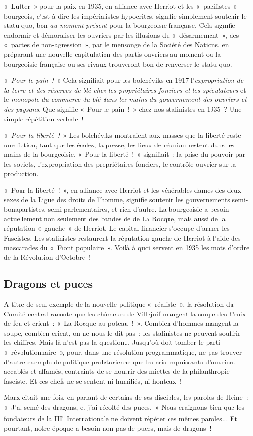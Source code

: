 \documentclass[french,twoside]{book} %
\begin{document}
« Lutter » pour la paix en 1935, en alliance avec Herriot et les « pacifistes » bourgeois, c’est-à-dire les impérialistes hypocrites, signifie simplement soutenir le statu quo, bon \emph{au moment présent} pour la bourgeoisie  française. Cela signifie endormir et démoraliser les ouvriers par les illusions du « désarmement », des « pactes de non-agression », par le mensonge de la Société des Nations, en préparant une nouvelle capitulation des partis ouvriers au moment ou la bourgeoisie française ou ses rivaux trouveront bon de renverser le statu quo.\par
« \emph{Pour le pain !} » Cela signifiait pour les bolchéviks en 1917 l’\emph{expropriation de la terre et des réserves de blé chez les propriétaires fonciers et les spéculateurs} et le \emph{monopole du commerce du blé dans les mains du gouvernement des ouvriers et des paysans}. Que signifie « Pour le pain ! » chez nos stalinistes en 1935 ? Une simple répétition verbale !\par
« \emph{Pour la liberté !} » Les bolchéviks montraient aux masses que la liberté reste une fiction, tant que les écoles, la presse, les lieux de réunion restent dans les mains de la bourgeoisie. « Pour la liberté ! » signifiait : la prise du pouvoir par les soviets, l’expropriation des propriétaires fonciers, le contrôle ouvrier sur la production.\par
« Pour la liberté ! », en alliance avec Herriot et les vénérables dames des deux sexes de la Ligue des droits de l’homme, signifie soutenir les gouvernements semi-bonapartistes, semi-parlementaires, et rien d’autre. La bourgeoisie a besoin actuellement non seulement des bandes de de La Rocque, mais aussi de la réputation « gauche » de Herriot. Le capital financier s’occupe d’armer les Fascistes. Les stalinistes restaurent la réputation gauche de Herriot à l’aide des mascarades du « Front populaire ». Voilà à quoi servent en 1935 les mots d’ordre de la Révolution d’Octobre !
\subsection[{Dragons et puces}]{Dragons et puces}
\noindent A titre de seul exemple de la nouvelle politique « réaliste », la résolution du Comité central raconte que les  chômeurs de Villejuif mangent la soupe des Croix de feu et crient : « La Rocque au poteau ! ». Combien d’hommes mangent la soupe, combien crient, on ne nous le dit pas : les stalinistes ne peuvent souffrir les chiffres. Mais là n’est pas la question... Jusqu’où doit tomber le parti « révolutionnaire », pour, dans une résolution programmatique, ne pas trouver d’autre exemple de politique prolétarienne que les cris impuissants d’ouvriers accablés et affamés, contraints de se nourrir des miettes de la philanthropie fasciste. Et ces chefs ne se sentent ni humiliés, ni honteux !\par
Marx citait une fois, en parlant de certains de ses disciples, les paroles de Heine : « J’ai semé des dragons, et j’ai récolté des puces. » Nous craignons bien que les fondateurs de la III\textsuperscript{e} Internationale ne doivent répéter ces mêmes paroles... Et pourtant, notre époque a besoin non pas de puces, mais de dragons !
\end{document}
